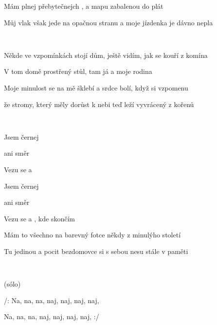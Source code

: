 

\zs
Mám  plnej přebytečnejch , a mapu zabalenou do plát 

Můj vlak však jede na opačnou stranu a moje jízdenka je dávno nepla 
\ks

 ~  ~  ~  

\zs
Někde ve vzpomínkách stojí dům, ještě vidím, jak se kouří z komína 

V tom domě prostřený stůl, tam já a moje rodina 

Moje minulost se na mě šklebí a srdce bolí, když si vzpomenu 

že stromy, který měly dorůst k nebi teď leží vyvrácený z kořenů 
\ks

 ~  ~  ~  

\zr
Jsem černej 

  ani směr

Vezu se   a 

Jsem černej 

  ani směr

Vezu se   a , kde skončím
\kr

\zs
Mám to všechno na barevný fotce někdy z minulýho století 

Tu jedinou a pocit bezdomovce si s sebou nesu stále v paměti 
\ks

 ~  ~  ~  

\zr \kr

\zr(sólo)\kr

\zs

/: Na, na, na, naj, naj, naj, naj, 
 
Na, na, na, naj, naj, naj, naj,  :/
\ks

\kp